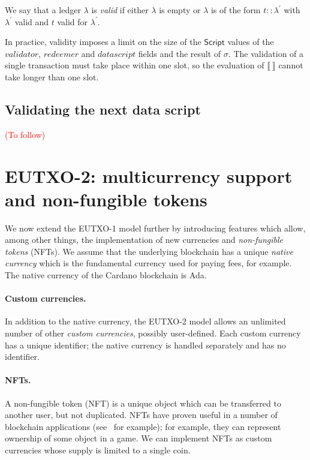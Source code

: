 \documentclass[a4paper]{article}
\newcommand{\red}[1]{\textcolor{red}{#1}}
\newcommand{\mi}[1]{\ensuremath{\mathit{#1}}}
\newcommand{\validator}{\mi{validator}}
\newcommand{\redeemer}{\mi{redeemer}}
\newcommand{\datascript}{\mi{datascript}}
\begin{document}
\noindent We say that a ledger
$\lambda$ is \textit{valid} if either $\lambda$ is empty or
$\lambda$ is of the form $t::\lambda^{\prime}$ with
$\lambda^{\prime}$ valid and $t$ valid for $\lambda^{\prime}$.


In practice, validity imposes a limit on the size of the
$\mathsf{Script}$ values of the $\validator$, $\redeemer$ and
$\datascript$ fields and the result of $\sigma$. The validation of a
single transaction must take place within one slot, so the evaluation
of $\llbracket ~ \rrbracket$ cannot take longer than one slot.

\subsection{Validating the next data script}
\label{sec:validating-next}
\red{(To follow)}

\newpage
\section{EUTXO-2: multicurrency support and non-fungible tokens}
\label{sec:eutxo-2}
We now extend the EUTXO-1 model further by introducing features which
allow, among other things, the implementation of new currencies and
\textit{non-fungible tokens} (NFTs).  We assume that the underlying
blockchain has a unique \textit{native currency} which is the
fundamental currency used for paying fees, for example.  The native
currency of the Cardano blockchain is Ada.

\paragraph{Custom currencies.} In addition to the native currency, the
EUTXO-2 model allows an unlimited number of other \textit{custom
  currencies}, possibly user-defined.  Each custom currency has a
unique identifier; the native currency is handled separately and has
no identifier.

\paragraph{NFTs.}
A non-fungible token (NFT) is a unique object which can be transferred
to another user, but not duplicated.  NFTs have proven useful in a
number of blockchain applications (see~\citep{ERC-721} for example);
for example, they can represent ownership of some object in a game.
We can implement NFTs as custom currencies whose supply is limited to
a single coin.
\end{document}
